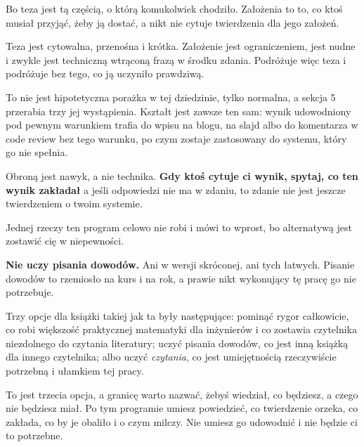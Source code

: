 \begin{fr}
\begin{ansblock}
Bo teza jest tą częścią, o którą komukolwiek chodziło. Założenia to to, co
ktoś musiał przyjąć, żeby ją dostać, a nikt nie cytuje twierdzenia dla jego
założeń.
\end{ansblock}

Teza jest cytowalna, przenośna i krótka. Założenie jest ograniczeniem, jest
nudne i zwykle jest techniczną wtrąconą frazą w środku zdania. Podróżuje więc
teza \dash{} i podróżuje bez tego, co ją uczyniło prawdziwą.

\begin{aibox}
To nie jest hipotetyczna porażka w tej dziedzinie, tylko normalna, a sekcja 5
przerabia trzy jej wystąpienia. Kształt jest zawsze ten sam: wynik
udowodniony pod pewnym warunkiem trafia do wpisu na blogu, na slajd albo do
komentarza w code review bez tego warunku, po czym zostaje zastosowany do
systemu, który go nie spełnia.

Obroną jest nawyk, a nie technika. \textbf{Gdy ktoś cytuje ci wynik, spytaj,
co ten wynik zakładał} \dash{} a jeśli odpowiedzi nie ma w zdaniu, to zdanie
nie jest jeszcze twierdzeniem o twoim systemie.
\end{aibox}
\end{fr}

\begin{fr}
Jednej rzeczy ten program celowo nie robi i mówi to wprost, bo alternatywą
jest zostawić cię w niepewności.

\textbf{Nie uczy pisania dowodów.} Ani w wersji skróconej, ani tych łatwych.
Pisanie dowodów to rzemiosło na kurs i na rok, a prawie nikt wykonujący tę
pracę go nie potrzebuje.

\begin{rigourbox}
Trzy opcje dla książki takiej jak ta były następujące: pominąć rygor
całkowicie, co robi większość praktycznej matematyki dla inżynierów i co
zostawia czytelnika niezdolnego do czytania literatury; uczyć pisania
dowodów, co jest inną książką dla innego czytelnika; albo uczyć
\emph{czytania}, co jest umiejętnością rzeczywiście potrzebną i ułamkiem tej
pracy.

To jest trzecia opcja, a granicę warto nazwać, żebyś wiedział, co będziesz, a
czego nie będziesz miał. Po tym programie umiesz powiedzieć, co twierdzenie
orzeka, co zakłada, co by je obaliło i o czym milczy. Nie umiesz go
udowodnić i nie będzie ci to potrzebne.
\end{rigourbox}
\end{fr}

